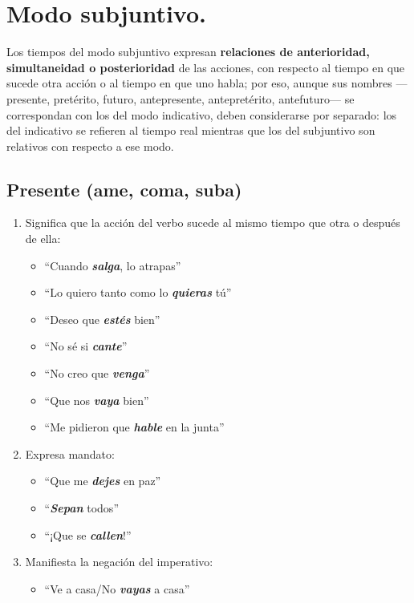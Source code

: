 \documentclass[14pt]{extarticle}
\newcommand{\marcatexto}[1]{\textbf{\textit{#1}}}
\begin{document}
\section{Modo subjuntivo.}

Los tiempos del modo subjuntivo expresan \textbf{relaciones de anterioridad, simultaneidad o posterioridad} de las acciones, con respecto al tiempo en que sucede otra acción o al tiempo en que uno habla; por eso, aunque sus nombres —presente, pretérito, futuro, antepresente, antepretérito, antefuturo— se correspondan con los del modo indicativo, deben considerarse por separado: los del indicativo se refieren al tiempo real mientras que los del subjuntivo son relativos con respecto a ese modo.

\subsection{Presente (ame, coma, suba)}

\begin{enumerate}[label=\alph*)]
\item Significa que la acción del verbo sucede al mismo tiempo que otra o después de ella:
\begin{itemize}
\item \enquote{Cuando \marcatexto{salga}, lo atrapas}
\item \enquote{Lo quiero tanto como lo \marcatexto{quieras} tú}
\item \enquote{Deseo que \marcatexto{estés} bien}
\item \enquote{No sé si \marcatexto{cante}}
\item \enquote{No creo que \marcatexto{venga}}
\item \enquote{Que nos \marcatexto{vaya} bien}
\item \enquote{Me pidieron que \marcatexto{hable} en la junta}
\end{itemize}
\item Expresa mandato:
\begin{itemize}
\item \enquote{Que me \marcatexto{dejes} en paz}
\item \enquote{\marcatexto{Sepan} todos}
\item \enquote{¡Que se \marcatexto{callen}!}
\end{itemize}
\item Manifiesta la negación del imperativo:
\begin{itemize}
\item \enquote{Ve a casa/No \marcatexto{vayas} a casa}
\end{itemize}
\end{enumerate}
\end{document}
